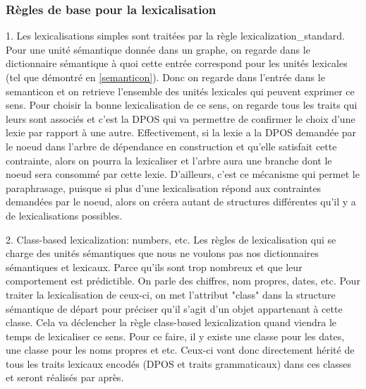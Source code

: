 \subsubsection{Règles de base pour la lexicalisation}

1. Les lexicalisations simples sont traitées par la règle lexicalization\_standard. Pour une unité sémantique donnée dans un graphe, on regarde dans le dictionnaire sémantique à quoi cette entrée correspond pour les unités lexicales (tel que démontré en \ref{semanticon}). Donc on regarde dans l'entrée dans le semanticon et on retrieve l'ensemble des unités lexicales qui peuvent exprimer ce sens. Pour choisir la bonne lexicalisation de ce sens, on regarde tous les traits qui leurs sont associés et c'est la DPOS qui va permettre de confirmer le choix d'une lexie par rapport à une autre. Effectivement, si la lexie a la DPOS demandée par le noeud dans l'arbre de dépendance en construction et qu'elle satisfait cette contrainte, alors on pourra la lexicaliser et l'arbre aura une branche dont le noeud sera consommé par cette lexie. D'ailleurs, c'est ce mécanisme qui permet le paraphrasage, puisque si plus d'une lexicalisation répond aux contraintes demandées par le noeud, alors on créera autant de structures différentes qu'il y a de lexicalisations possibles. 

2. Class-based lexicalization: numbers, etc. Les règles de lexicalisation qui se charge des unités sémantiques que nous ne voulons pas nos dictionnaires sémantiques et lexicaux.  Parce qu'ils sont trop nombreux et que leur comportement est prédictible. On parle des chiffres, nom propres, dates, etc. Pour traiter la lexicalisation de ceux-ci, on met l'attribut "class" dans la structure sémantique de départ pour préciser qu'il s'agit d'un objet appartenant à cette classe. Cela va déclencher la règle class-based lexicalization quand viendra le temps de lexicaliser ce sens. Pour ce faire, il y existe une classe pour les dates, une classe pour les noms propres et etc. Ceux-ci vont donc directement hérité de tous les traits lexicaux encodés (DPOS et traits grammaticaux) dans ces classes et seront réalisés par après. 

